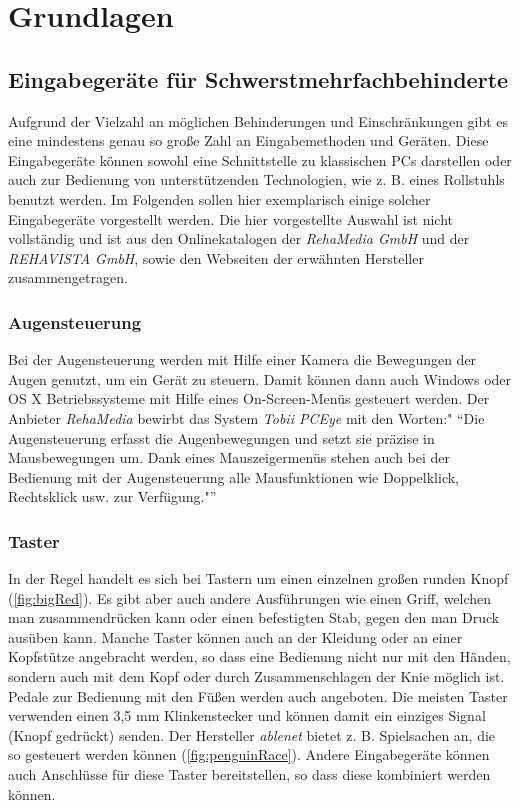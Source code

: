 \section{Grundlagen}

	\subsection{Eingabegeräte für Schwerstmehrfachbehinderte}
    \label{sec:input-devices}
    
    	Aufgrund der Vielzahl an möglichen Behinderungen und Einschränkungen gibt es eine mindestens genau so große Zahl an Eingabemethoden und Geräten. Diese Eingabegeräte können sowohl eine Schnittstelle zu klassischen PCs darstellen oder auch zur Bedienung von unterstützenden Technologien, wie z. B. eines Rollstuhls benutzt werden. Im Folgenden sollen hier exemplarisch einige solcher Eingabegeräte vorgestellt werden. Die hier vorgestellte Auswahl ist nicht vollständig und ist aus den Onlinekatalogen der \emph{RehaMedia GmbH} und der \emph{REHAVISTA GmbH}, sowie den Webseiten der erwähnten Hersteller zusammengetragen.
        
        \subsubsection*{Augensteuerung}
        	Bei der Augensteuerung werden mit Hilfe einer Kamera die Bewegungen der Augen genutzt, um ein Gerät zu steuern. Damit können dann auch Windows oder OS X Betriebssysteme mit Hilfe eines On-Screen-Menüs gesteuert werden. Der Anbieter \emph{RehaMedia} bewirbt das System \emph{Tobii PCEye} mit den Worten:" \enquote{Die Augensteuerung erfasst die Augenbewegungen und setzt sie präzise in Mausbewegungen um. Dank eines Mauszeigermenüs stehen auch bei der Bedienung mit der Augensteuerung alle Mausfunktionen wie Doppelklick, Rechtsklick usw. zur Verfügung."} \parencite{rehamedia:TobiiPCEyeGo}
            
         \subsubsection*{Taster}
         	In der Regel handelt es sich bei Tastern um einen einzelnen großen runden Knopf (\autoref{fig:bigRed}). Es gibt aber auch andere Ausführungen wie einen Griff, welchen man zusammendrücken kann oder einen befestigten Stab, gegen den man Druck ausüben kann. Manche Taster können auch an der Kleidung oder an einer Kopfstütze angebracht werden, so dass eine Bedienung nicht nur mit den Händen, sondern auch mit dem Kopf oder durch  Zusammenschlagen der Knie möglich ist. Pedale zur Bedienung mit den Füßen werden auch angeboten. Die meisten Taster verwenden einen 3,5 mm Klinkenstecker und können damit ein einziges Signal (Knopf gedrückt) senden. Der Hersteller \emph{ablenet} bietet z. B. Spielsachen an, die so gesteuert werden können (\autoref{fig:penguinRace}). Andere Eingabegeräte können auch Anschlüsse für diese Taster bereitstellen, so dass diese kombiniert werden können.  
         	
